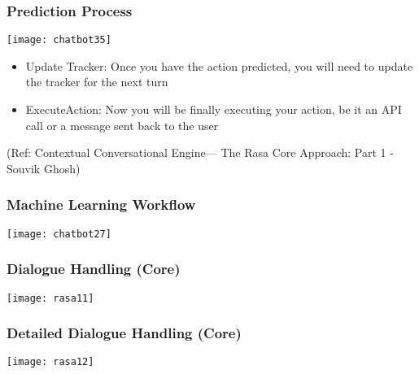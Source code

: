  \begin{frame}[fragile]\frametitle{Prediction Process}
 

\begin{center}
\texttt{[image: chatbot35]}

\end{center}

\begin{itemize}
\item Update Tracker: Once you have the action predicted, you will need to update the tracker for the next turn
\item ExecuteAction: Now you will be finally executing your action, be it an API call or a message sent back to the user
\end{itemize}


\tiny{(Ref: Contextual Conversational Engine— The Rasa Core Approach: Part 1 - Souvik Ghosh)}

\end{frame}


 \begin{frame}[fragile]\frametitle{Machine Learning Workflow}
\begin{center}
\texttt{[image: chatbot27]}

\end{center}

\end{frame}
\begin{frame}[fragile]\frametitle{Dialogue Handling (Core)}


\begin{center}
\texttt{[image: rasa11]}
\end{center}


\end{frame}

\begin{frame}[fragile]\frametitle{Detailed Dialogue Handling (Core)}


\begin{center}
\texttt{[image: rasa12]}
\end{center}


\end{frame}
